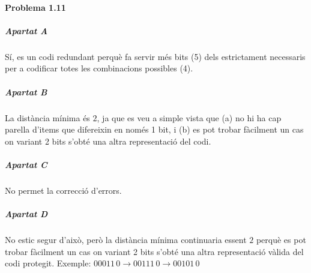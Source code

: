\finishpage


\startpage

\paragraph{Problema 1.11}

\subparagraph{Apartat A}

Sí, es un codi redundant perquè fa servir més bits (5) dels estrictament necessaris
per a codificar totes les combinacions possibles (4).

\subparagraph{Apartat B}

La distància mínima és $2$, ja que es veu a simple vista que (a) no hi
ha cap parella d'items que difereixin en només 1 bit, i (b) es pot trobar fàcilment
un cas on variant 2 bits s'obté una altra representació del codi.

\subparagraph{Apartat C}

No permet la correcció d'errors.

\subparagraph{Apartat D}

No estic segur d'això, però la distància mínima continuaria essent $2$
perquè es pot trobar fàcilment un cas on variant 2 bits s'obté una altra representació
vàlida del codi protegit. Exemple: $00011\,0 \rightarrow 00111\,0 \rightarrow 00101\,0$

\finishpage


